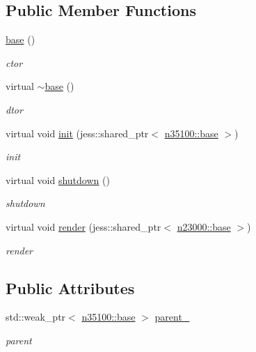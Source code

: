 \subsection*{Public Member Functions}
\begin{DoxyCompactItemize}
\item 
\hyperlink{classnebula_1_1content_1_1shape_1_1renderer_1_1base_a92cb9592da6a0f4a71df83f163330f8b}{base} ()
\begin{DoxyCompactList}\small\item\em ctor \item\end{DoxyCompactList}\item 
virtual \hyperlink{classnebula_1_1content_1_1shape_1_1renderer_1_1base_a8dbb5bad65da86bdecc66c6cac6f0e3b}{$\sim$base} ()
\begin{DoxyCompactList}\small\item\em dtor \item\end{DoxyCompactList}\item 
virtual void \hyperlink{classnebula_1_1content_1_1shape_1_1renderer_1_1base_a23ca4a9ed061df97755b6d845533ce1f}{init} (jess::shared\_\-ptr$<$ \hyperlink{classnebula_1_1content_1_1shape_1_1admin_1_1base}{n35100::base} $>$)
\begin{DoxyCompactList}\small\item\em init \item\end{DoxyCompactList}\item 
virtual void \hyperlink{classnebula_1_1content_1_1shape_1_1renderer_1_1base_a3e5311f8c103a0ae28e20c4145737cf8}{shutdown} ()
\begin{DoxyCompactList}\small\item\em shutdown \item\end{DoxyCompactList}\item 
virtual void \hyperlink{classnebula_1_1content_1_1shape_1_1renderer_1_1base_ae34770ec8371ffd3d62cee52f5b72f85}{render} (jess::shared\_\-ptr$<$ \hyperlink{classnebula_1_1platform_1_1renderer_1_1base}{n23000::base} $>$)
\begin{DoxyCompactList}\small\item\em render \item\end{DoxyCompactList}\end{DoxyCompactItemize}
\subsection*{Public Attributes}
\begin{DoxyCompactItemize}
\item 
std::weak\_\-ptr$<$ \hyperlink{classnebula_1_1content_1_1shape_1_1admin_1_1base}{n35100::base} $>$ \hyperlink{classnebula_1_1content_1_1shape_1_1renderer_1_1base_a1e9244bd3fd366195582985ac79e2701}{parent\_\-}
\begin{DoxyCompactList}\small\item\em parent \item\end{DoxyCompactList}\end{DoxyCompactItemize}


